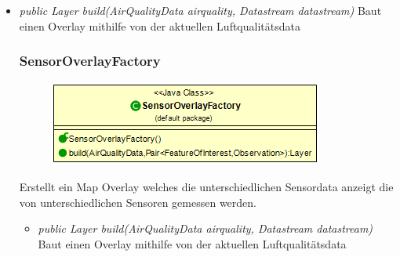 \begin{itemize} [noitemsep]
    \item \emph{public Layer build(AirQualityData airquality,  Datastream datastream)} Baut einen Overlay mithilfe von der aktuellen Luftqualitätsdata

\subsubsection{SensorOverlayFactory}
\begin{minipage}{0.3\textwidth}
    \begin{figure}[H]
        \includegraphics[scale = 0.5
        ]{media/view/factory/SensorOverlayFactory_Class.png}
    \end{figure}
    \end{minipage} \hfill
    \begin{minipage}{0.6\textwidth}
        Erstellt ein Map Overlay welches die unterschiedlichen Sensordata anzeigt die von unterschiedlichen Sensoren gemessen werden.
\end{minipage}

\begin{itemize} [noitemsep]
    \item \emph{public Layer build(AirQualityData airquality,  Datastream datastream)} Baut einen Overlay mithilfe von der aktuellen Luftqualitätsdata
\end{itemize}


\end{itemize}
